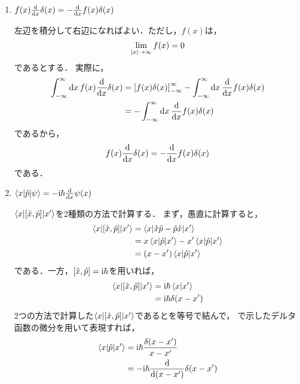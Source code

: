 \documentclass{report}
\begin{document}
    \begin{enumerate}
      \item $f(x)\dv{x}\delta(x) = -\dv{x}f(x)\delta(x)$\par
        左辺を積分して右辺になればよい．ただし，$f(x)$は，
        \begin{align}
          \lim_{\abs{x} \to \infty}f(x) = 0
        \end{align}
        であるとする．
        実際に，
        \begin{align}
          \int_{-\infty}^{\infty}\dd{x}f(x)\dv{x}\delta(x) &= \qty[f(x)\delta(x)]_{-\infty}^{\infty} - \int_{-\infty}^{\infty}\dd{x}\dv{x}f(x)\delta(x) \\ 
          &= - \int_{-\infty}^{\infty}\dd{x}\dv{x}f(x)\delta(x)
        \end{align}
        であるから，
        \begin{align}
          f(x)\dv{x}\delta(x) = -\dv{x}f(x)\delta(x)\label{delta-function-diff}
        \end{align}
        である．  
      \item $\mel**{x}{\hat{p}}{\psi} = -\mathrm{i}\hbar\dv{x}\psi(x)$\par
        $\mel**{x}{\qty[\hat{x}, \hat{p}]}{x'}$を2種類の方法で計算する．
        まず，愚直に計算すると，
        \begin{align}
          \mel**{x}{\qty[\hat{x}, \hat{p}]}{x'} &= \mel**{x}{\hat{x}\hat{p} - \hat{p}\hat{x}}{x'} \\ 
          &= x\mel**{x}{\hat{p}}{x'} - x'\mel**{x}{\hat{p}}{x'} \\ 
          &= \qty(x - x')\mel**{x}{\hat{p}}{x'}\label{xxpxprime-1}
        \end{align}
        である．一方，$\qty[\hat{x}, \hat{p}] = \mathrm{i}\hbar$を用いれば，
        \begin{align}
          \mel**{x}{\qty[\hat{x}, \hat{p}]}{x'} &= \mathrm{i}\hbar\braket{x}{x'} \\ 
          &= \mathrm{i}\hbar\delta(x - x')\label{xxpxprime-2}
        \end{align}
        2つの方法で計算した$\mel**{x}{\qty[\hat{x}, \hat{p}]}{x'}$であるとを等号で結んで，
        で示したデルタ函数の微分を用いて表現すれば，
        \begin{align}
          \mel**{x}{\hat{p}}{x'} &= \i\hbar\frac{\delta(x - x')}{x - x'} \\ 
          &= -\i\hbar\dv{\qty(x - x')}\delta(x - x') \\ 

\end{align}
\end{enumerate}
\end{document}
